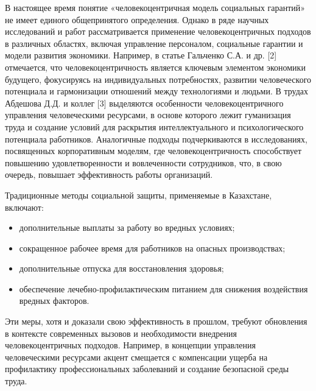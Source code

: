 \begin{multicols}{2}
В настоящее время понятие «человекоцентричная модель социальных
гарантий» не имеет единого общепринятого определения. Однако в ряде
научных исследований и работ рассматривается применение
человекоцентричных подходов в различных областях, включая управление
персоналом, социальные гарантии и модели развития экономики. Например, в
статье Гальченко С.А. и др. {[}2{]} отмечается, что человекоцентричность
является ключевым элементом экономики будущего, фокусируясь на
индивидуальных потребностях, развитии человеческого потенциала и
гармонизации отношений между технологиями и людьми\hspace{0pt}. В трудах
Абдешова Д.Д. и коллег {[}3{]} выделяются особенности
человекоцентричного управления человеческими ресурсами, в основе
которого лежит гуманизация труда и создание условий для раскрытия
интеллектуального и психологического потенциала работников\hspace{0pt}.
Аналогичные подходы подчеркиваются в исследованиях, посвященных
корпоративным моделям, где человекоцентричность способствует повышению
удовлетворенности и вовлеченности сотрудников, что, в свою очередь,
повышает эффективность работы организаций\hspace{0pt}\hspace{0pt}.

Традиционные методы социальной защиты, применяемые в Казахстане,
включают:

\begin{itemize}
\item
  дополнительные выплаты за работу во вредных условиях;
\item
  сокращенное рабочее время для работников на опасных производствах;
\item
  дополнительные отпуска для восстановления здоровья;
\item
  обеспечение лечебно-профилактическим питанием для снижения воздействия
  вредных факторов\hspace{0pt}\hspace{0pt}.
\end{itemize}

Эти меры, хотя и доказали свою эффективность в прошлом, требуют
обновления в контексте современных вызовов и необходимости внедрения
человекоцентричных подходов. Например, в концепции управления
человеческими ресурсами акцент смещается с компенсации ущерба на
профилактику профессиональных заболеваний и создание безопасной среды
труда\hspace{0pt}\hspace{0pt}.


\end{multicols}
